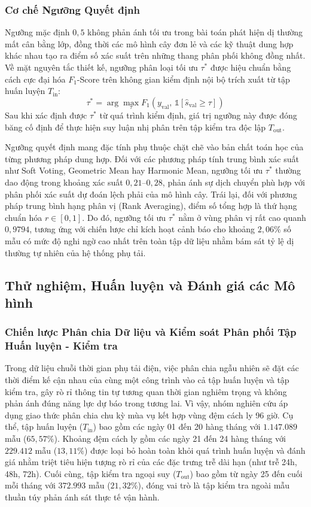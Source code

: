 \subsubsection{Cơ chế Ngưỡng Quyết định}
Ngưỡng mặc định $0{,}5$ không phản ánh tối ưu trong bài toán phát hiện dị thường mất cân bằng lớp, đồng thời các mô hình cây đơn lẻ và các kỹ thuật dung hợp khác nhau tạo ra điểm số xác suất trên những thang phân phối không đồng nhất. Về mặt nguyên tắc thiết kế, ngưỡng phân loại tối ưu $\tau^*$ được hiệu chuẩn bằng cách cực đại hóa $F_1$-Score trên không gian kiểm định nội bộ trích xuất từ tập huấn luyện $T_{\text{in}}$:
\begin{equation*}
    \tau^* = \arg\max_{\tau} F_1\left(y_{\text{val}}, \, \mathbb{1}[\hat{s}_{\text{val}} \geq \tau]\right)
\end{equation*}
Sau khi xác định được $\tau^*$ từ quá trình kiểm định, giá trị ngưỡng này được đóng băng cố định để thực hiện suy luận nhị phân trên tập kiểm tra độc lập $T_{\text{out}}$. 

Ngưỡng quyết định mang đặc tính phụ thuộc chặt chẽ vào bản chất toán học của từng phương pháp dung hợp. Đối với các phương pháp tính trung bình xác suất như Soft Voting, Geometric Mean hay Harmonic Mean, ngưỡng tối ưu $\tau^*$ thường dao động trong khoảng xác suất $0{,}21$--$0{,}28$, phản ánh sự dịch chuyển phù hợp với phân phối xác suất dự đoán lệch phải của mô hình cây. Trái lại, đối với phương pháp trung bình hạng phân vị (Rank Averaging), điểm số tổng hợp là thứ hạng chuẩn hóa $r \in [0, 1]$. Do đó, ngưỡng tối ưu $\tau^*$ nằm ở vùng phân vị rất cao quanh $0{,}9794$, tương ứng với chiến lược chỉ kích hoạt cảnh báo cho khoảng $2{,}06\%$ số mẫu có mức độ nghi ngờ cao nhất trên toàn tập dữ liệu nhằm bám sát tỷ lệ dị thường tự nhiên của hệ thống phụ tải.

\subsection{Thử nghiệm, Huấn luyện và Đánh giá các Mô hình}

\subsubsection{Chiến lược Phân chia Dữ liệu và Kiểm soát Phân phối Tập Huấn luyện - Kiểm tra}

Trong dữ liệu chuỗi thời gian phụ tải điện, việc phân chia ngẫu nhiên sẽ đặt các thời điểm kế cận nhau của cùng một công trình vào cả tập huấn luyện và tập kiểm tra, gây rò rỉ thông tin tự tương quan thời gian nghiêm trọng và không phản ánh đúng năng lực dự báo trong tương lai. Vì vậy, nhóm nghiên cứu áp dụng giao thức phân chia chu kỳ mùa vụ kết hợp vùng đệm cách ly 96 giờ. Cụ thể, tập huấn luyện ($T_{\text{in}}$) bao gồm các ngày 01 đến 20 hàng tháng với $1.147.089$ mẫu ($65{,}57\%$). Khoảng đệm cách ly gồm các ngày 21 đến 24 hàng tháng với $229.412$ mẫu ($13{,}11\%$) được loại bỏ hoàn toàn khỏi quá trình huấn luyện và đánh giá nhằm triệt tiêu hiện tượng rò rỉ của các đặc trưng trễ dài hạn (như trễ 24h, 48h, 72h). Cuối cùng, tập kiểm tra ngoại suy ($T_{\text{out}}$) bao gồm từ ngày 25 đến cuối mỗi tháng với $372.993$ mẫu ($21{,}32\%$), đóng vai trò là tập kiểm tra ngoài mẫu thuần túy phản ánh sát thực tế vận hành.

